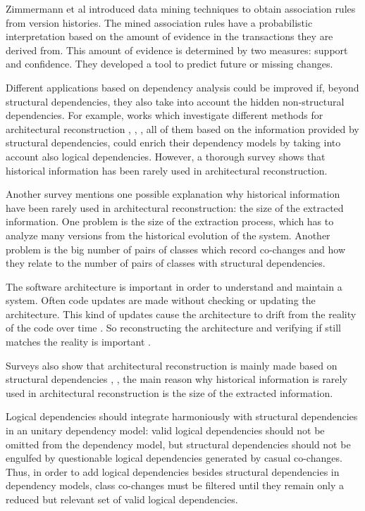 \documentclass[12pt]{mitthesis}
\begin{document}
Zimmermann et al \cite{Zimmermann:2004:MVH:998675.999460} introduced data mining techniques to obtain association rules from version histories.
The mined association rules  have a probabilistic interpretation based on the amount of evidence in the transactions they are derived from. This amount of evidence is determined by two measures: support and confidence.  They developed a tool to predict future or missing changes.

Different applications based on dependency analysis could be improved if, beyond structural dependencies, they also take into account the hidden non-structural dependencies. For example, works  which investigate different methods for architectural reconstruction \cite{SoraConti}, \cite{SoraSem13}, \cite{PagerankENASE},  all of them based on the information provided by structural dependencies, could enrich their dependency models by taking into account also logical dependencies. However, a thorough survey \cite{sar} shows that historical information has been rarely used in architectural reconstruction. 

Another survey \cite{Shtern:2012:CMS:2332427.2332428} mentions one possible explanation why historical information have been rarely used in architectural reconstruction: the size of the extracted information. One problem is the size of the extraction process, which has to analyze many versions from the historical evolution of the system. Another problem is the big number of pairs of classes which record co-changes and how they relate to the number of pairs of classes with structural dependencies.

The software architecture is important in order to understand and maintain a system. Often code updates are made without checking or updating the architecture. This kind of updates cause the architecture to drift from the reality of the code over time \cite{sar}.
So reconstructing the architecture and verifying if still matches the reality is important \cite{Kalliamvakou2016}. 

Surveys also show that architectural reconstruction is mainly made based on structural dependencies \cite{Shtern:2012:CMS:2332427.2332428}, \cite{sar}, the main reason why historical information is rarely used in architectural reconstruction is the size of the extracted information.

Logical dependencies should integrate harmoniously with structural dependencies in an unitary dependency model: valid logical dependencies should not be omitted from the dependency model, but structural dependencies should not be engulfed by questionable logical dependencies generated by casual co-changes.  
Thus, in order to add logical dependencies besides structural dependencies in dependency models, class co-changes must be filtered until they remain only a reduced but relevant set of valid logical dependencies. 
\end{document}
